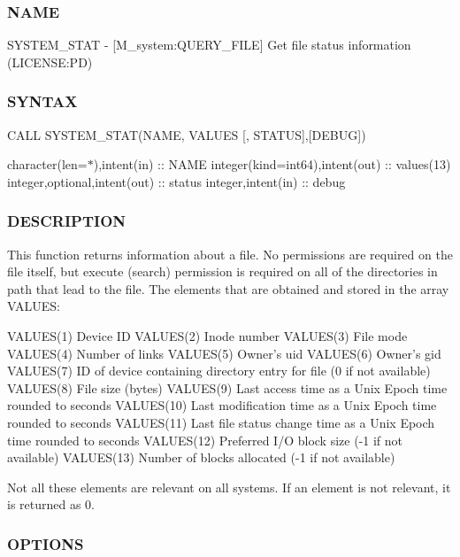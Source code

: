 \subsubsection*{N\+A\+ME}

S\+Y\+S\+T\+E\+M\+\_\+\+S\+T\+AT -\/ \mbox{[}M\+\_\+system\+:Q\+U\+E\+R\+Y\+\_\+\+F\+I\+LE\mbox{]} Get file status information (L\+I\+C\+E\+N\+SE\+:PD) 

\subsubsection*{S\+Y\+N\+T\+AX}

C\+A\+LL S\+Y\+S\+T\+E\+M\+\_\+\+S\+T\+A\+T(\+N\+A\+M\+E, V\+A\+L\+U\+E\+S \mbox{[}, S\+T\+A\+T\+U\+S\mbox{]},\mbox{[}\+D\+E\+B\+U\+G\mbox{]})

character(len=$\ast$),intent(in) \+:\+: N\+A\+ME integer(kind=int64),intent(out) \+:\+: values(13) integer,optional,intent(out) \+:\+: status integer,intent(in) \+:\+: debug

\subsubsection*{D\+E\+S\+C\+R\+I\+P\+T\+I\+ON}

\begin{DoxyVerb}This function returns information about a file. No permissions are
required on the file itself, but execute (search) permission is required
on all of the directories in path that lead to the file. The elements
that are obtained and stored in the array VALUES:

   VALUES(1) Device ID
   VALUES(2) Inode number
   VALUES(3) File mode
   VALUES(4) Number of links
   VALUES(5) Owner's uid
   VALUES(6) Owner's gid
   VALUES(7) ID of device containing directory entry for file (0 if not available)
   VALUES(8) File size (bytes)
   VALUES(9) Last access time as a Unix Epoch time rounded to seconds
   VALUES(10) Last modification time as a Unix Epoch time rounded to seconds
   VALUES(11) Last file status change time as a Unix Epoch time rounded to seconds
   VALUES(12) Preferred I/O block size (-1 if not available)
   VALUES(13) Number of blocks allocated (-1 if not available)

Not all these elements are relevant on all systems. If an element is
not relevant, it is returned as 0.
\end{DoxyVerb}


\subsubsection*{O\+P\+T\+I\+O\+NS}

